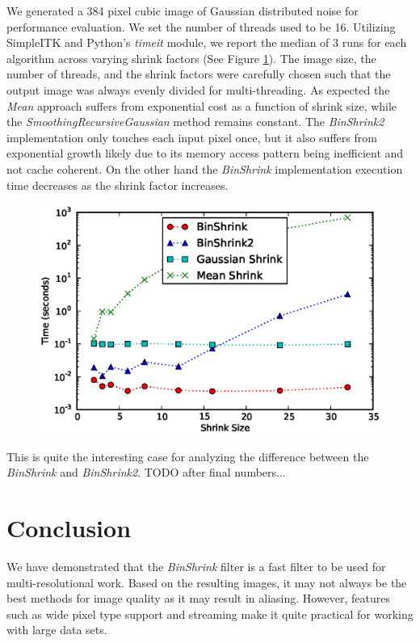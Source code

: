 \documentclass{InsightArticle}
\begin{document}
We generated a 384 pixel cubic image of Gaussian distributed noise for
performance evaluation. We set the number of threads used to be
16. Utilizing SimpleITK and Python's
\textit{timeit} module, we report the median of 3 runs for each
algorithm across varying shrink factors (See Figure
\ref{fig:ShrinkPerformance}).  The image size, the number of threads,
and the shrink factors were carefully chosen such that the output
image was always evenly divided for multi-threading. As expected the
\textit{Mean} approach suffers from exponential cost as a function of
shrink size, while the
\textit{SmoothingRecursiveGaussian} method remains constant. The
\textit{BinShrink2} implementation only touches each input pixel once,
but it also suffers from exponential growth likely due to its memory
access pattern being inefficient and not cache coherent. On the other
hand the \textit{BinShrink} implementation execution time decreases as
the shrink factor increases.

\begin{figure}
  \centering
  \includegraphics[width=0.8\linewidth]{images/shrink_time}
  \label{fig:ShrinkPerformance}
\end{figure}

This is quite the interesting case for analyzing the difference
between the \textit{BinShrink} and \textit{BinShrink2}. TODO after
final numbers...

\section{Conclusion}

We have demonstrated that the \textit{BinShrink} filter is a fast
filter to be used for multi-resolutional work. Based on the resulting
images, it may not always be the best methods for image quality as it
may result in aliasing. However, features such as wide pixel type
support and streaming make it quite practical for working with large
data sets.




\end{document}
